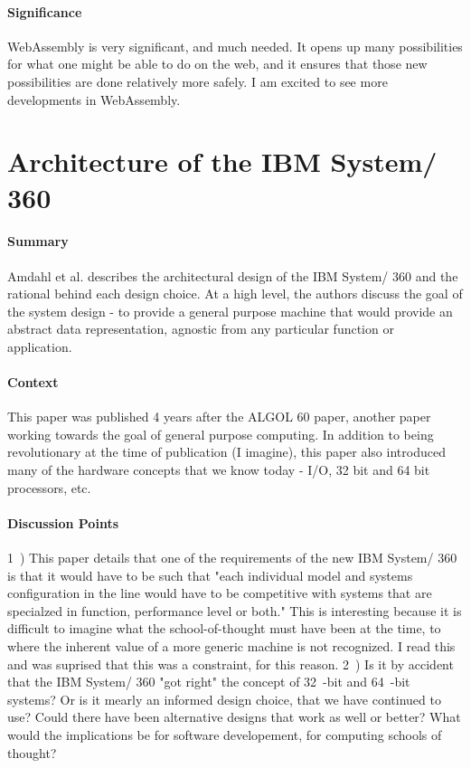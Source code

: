 \paragraph{\textbf{Significance}}
WebAssembly is very significant, and much needed. It opens up many
possibilities for what one might be able to do on the web, and it ensures
that those new possibilities are done relatively more safely. I am excited
to see more developments in WebAssembly.


\section {Architecture of the IBM System/ 360 \cite{amdahl1964architecture}}


\paragraph{\textbf{Summary}}
Amdahl et al. describes the architectural design of the IBM System/ 360 and
the rational behind each design choice. At a high level, the authors discuss
the goal of the system design - to provide a general purpose machine that
would provide an abstract data representation, agnostic from any particular
function or application.
\paragraph{\textbf{Context}}
This paper was published 4 years after the ALGOL 60 paper, another paper
working towards the goal of general purpose computing. In addition to being
revolutionary at the time of publication (I imagine), this paper also
introduced many of the hardware concepts that we know today - I/O, 32 bit
and 64 bit processors, etc.
\paragraph{\textbf{Discussion Points}}
1~) This paper details that one of the requirements of the new IBM System/
360 is that it would have to be such that "each individual model and
systems configuration in the line would have to be competitive with systems
that are specialzed in function, performance level or both." This is
interesting because it is difficult to imagine what the school-of-thought
must have been at the time, to where the inherent value of a more generic
machine is not recognized. I read this and was suprised that this was a
constraint, for this reason.
2~) Is it by accident that the IBM System/ 360 "got right" the concept of
32~-bit and 64~-bit systems? Or is it mearly an informed design choice, that
we have continued to use? Could there have been alternative designs that
work as well or better? What would the implications be for software
developement, for computing schools of thought?
